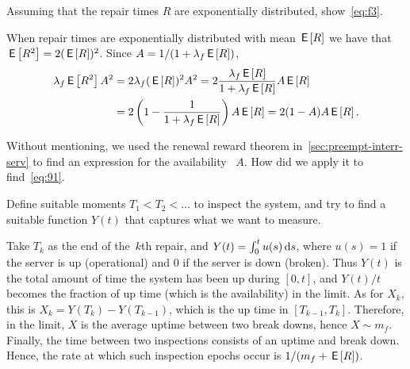 \documentclass[stochastic-or.tex]{subfiles}
\begin{document}
\begin{exercise}\label{ex:l-161}
Assuming that the repair times $R$ are exponentially distributed, show~\cref{eq:f3}.
\begin{solution}
When repair times are exponentially distributed with mean $\,\mathsf{E}\left[R\right]$ we have that  $\,\mathsf{E}\left[R^2\right]=2(\,\mathsf{E}\left[R\right])^2$. Since $A=1/(1+\lambda_f \,\mathsf{E}\left[R\right])$,
 \begin{equation*}
 \begin{split}
 \lambda_f \,\mathsf{E}\left[R^2\right] A^2
&= 2\lambda_f (\,\mathsf{E}\left[R\right])^2 A^2
= 2 \frac{\lambda_f \,\mathsf{E}\left[R\right] }{1+\lambda_f \,\mathsf{E}\left[R\right]} A \,\mathsf{E}\left[R\right] \\
&= 2 \left(1-\frac{1}{1+\lambda_f \,\mathsf{E}\left[R\right]}\right) A \,\mathsf{E}\left[R\right] = 2(1-A)A \,\mathsf{E}\left[R\right].
 \end{split}
 \end{equation*}
\end{solution}
\end{exercise}

\begin{exercise}
Without mentioning, we used the renewal reward theorem in~\cref{sec:preempt-interr-serv} to find an expression for the availability ~$A$.
How did we apply it to find~\cref{eq:91}.
\begin{hint}
Define suitable moments $T_{1} < T_{2} < \ldots$ to inspect the system, and try to find a suitable function $Y(t)$ that captures what we want to measure.
\end{hint}

\begin{solution}
Take $T_{k}$ as the end of the~$k$th repair, and $Y(t) = \int_0^{t} u(s) \,\textrm{d}s$, where $u(s) = 1$ if the server is up (operational) and 0 if the server is down (broken).
Thus $Y(t)$ is the total amount of time the system has been up during $[0,t]$, and $Y(t)/t$ becomes the fraction of up time (which is the availability) in the limit.
As for $X_{k}$, this is $X_k = Y(T_k)-Y(T_{k-1})$, which is the up time in $[T_{k-1}, T_{k}]$.
Therefore, in the limit, $X$ is the average uptime between two break downs, hence $X \sim m_{f}$.
Finally, the time between two inspections consists of an uptime and break down. Hence, the rate at which such inspection epochs occur is $1/(m_{f}+\,\mathsf{E}\left[R\right])$.
\end{solution}
\end{exercise}



\end{document}
